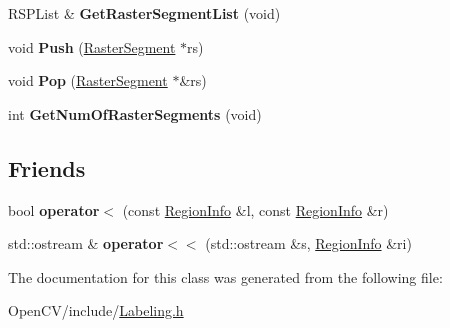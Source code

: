 \begin{DoxyCompactItemize}
\hypertarget{class_labeling_1_1_region_info_a1a147ca5752a2ac5daebb927ebe49c63}{}\label{class_labeling_1_1_region_info_a1a147ca5752a2ac5daebb927ebe49c63} 
R\+S\+P\+List \& {\bfseries Get\+Raster\+Segment\+List} (void)
\item 
\hypertarget{class_labeling_1_1_region_info_a043096f6f6a64c287307f72f574844ad}{}\label{class_labeling_1_1_region_info_a043096f6f6a64c287307f72f574844ad} 
void {\bfseries Push} (\hyperlink{class_labeling_1_1_raster_segment}{Raster\+Segment} $\ast$rs)
\item 
\hypertarget{class_labeling_1_1_region_info_a7532df61107650edc4ff82b7c2345bd6}{}\label{class_labeling_1_1_region_info_a7532df61107650edc4ff82b7c2345bd6} 
void {\bfseries Pop} (\hyperlink{class_labeling_1_1_raster_segment}{Raster\+Segment} $\ast$\&rs)
\item 
\hypertarget{class_labeling_1_1_region_info_a35eab6cbcd72a73ee7f63e90ffe44f3b}{}\label{class_labeling_1_1_region_info_a35eab6cbcd72a73ee7f63e90ffe44f3b} 
int {\bfseries Get\+Num\+Of\+Raster\+Segments} (void)
\end{DoxyCompactItemize}
\subsection*{Friends}
\begin{DoxyCompactItemize}
\item 
\hypertarget{class_labeling_1_1_region_info_a84e3a082347e41fbcf4a870a9f8f1064}{}\label{class_labeling_1_1_region_info_a84e3a082347e41fbcf4a870a9f8f1064} 
bool {\bfseries operator$<$} (const \hyperlink{class_labeling_1_1_region_info}{Region\+Info} \&l, const \hyperlink{class_labeling_1_1_region_info}{Region\+Info} \&r)
\item 
\hypertarget{class_labeling_1_1_region_info_acf144f688f407a3bcc597cdf22f40c77}{}\label{class_labeling_1_1_region_info_acf144f688f407a3bcc597cdf22f40c77} 
std\+::ostream \& {\bfseries operator$<$$<$} (std\+::ostream \&s, \hyperlink{class_labeling_1_1_region_info}{Region\+Info} \&ri)
\end{DoxyCompactItemize}


The documentation for this class was generated from the following file\+:\begin{DoxyCompactItemize}
\item 
Open\+C\+V/include/\hyperlink{_labeling_8h}{Labeling.\+h}\end{DoxyCompactItemize}
